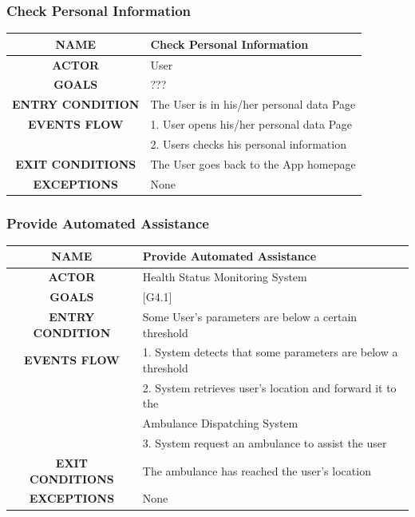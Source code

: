\documentclass[12pt,a4paper]{article}
\begin{document}
		\subsubsection{Check Personal Information}
		\begin{center}
			\begin{tabular}{| c | l |}
				\hline
				\textbf{NAME} & Check Personal Information \\
				\hline
				\textbf{ACTOR} & User \\
				\hline
				\textbf{GOALS} & ??? \\
				\hline
				\textbf{ENTRY CONDITION} & The User is in his/her personal data Page \\ \hline
				\textbf{EVENTS FLOW}  &
				1. User opens his/her personal data Page\\
				&2. Users checks his personal information\\
				\hline
				\textbf{EXIT CONDITIONS}  & The User goes back to the App homepage \\ \hline
				\textbf{EXCEPTIONS} &
				None\\
				\hline
			\end{tabular}
		\end{center}
	
		\subsubsection{Provide Automated Assistance}
		\begin{center}
			\begin{tabular}{| c | l |}
				\hline
				\textbf{NAME} & Provide Automated Assistance \\
				\hline
				\textbf{ACTOR} & Health Status Monitoring System \\
				\hline
				\textbf{GOALS} & [G4.1] \\
				\hline
				\textbf{ENTRY CONDITION} & Some User's parameters are below a certain threshold \\ \hline
				\textbf{EVENTS FLOW}  &
				1. System detects that some parameters are below a threshold\\
				&2. System retrieves user's location and forward it to the\\ 
				&Ambulance Dispatching System\\
				&3. System request an ambulance to assist the user\\
				\hline
				\textbf{EXIT CONDITIONS}  & The ambulance has reached the user's location \\ \hline
				\textbf{EXCEPTIONS} &
				None\\
				\hline
			\end{tabular}
		\end{center}
	
\end{document}
